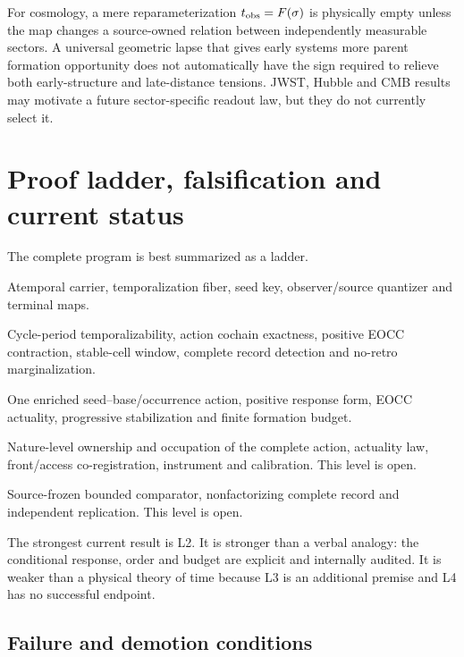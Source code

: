 \documentclass[11pt]{article}
\begin{document}
For cosmology, a mere reparameterization
\(t_{\rm obs}=F(\sigma)\) is physically empty unless the map changes a
source-owned relation between independently measurable sectors.  A universal
geometric lapse that gives early systems more parent formation opportunity
does not automatically have the sign required to relieve both early-structure
and late-distance tensions.  JWST, Hubble and CMB results may motivate a
future sector-specific readout law, but they do not currently select it.

\section{Proof ladder, falsification and current status}

The complete program is best summarized as a ladder.
\begin{description}[style=nextline,leftmargin=2.7cm]
\item[L0: definitions] Atemporal carrier, temporalization fiber, seed key,
observer/source quantizer and terminal maps.
\item[L1: exact finite mathematics] Cycle-period temporalizability, action
cochain exactness, positive EOCC contraction, stable-cell window, complete
record detection and no-retro marginalization.
\item[L2: conditional mechanism] One enriched seed--base/occurrence action,
positive response form, EOCC actuality, progressive stabilization and finite
formation budget.
\item[L3: physical source selection] Nature-level ownership and occupation of
the complete action, actuality law, front/access co-registration, instrument
and calibration.  This level is open.
\item[L4: empirical discrimination] Source-frozen bounded comparator,
nonfactorizing complete record and independent replication.  This level is
open.
\end{description}

The strongest current result is L2.  It is stronger than a verbal analogy:
the conditional response, order and budget are explicit and internally
audited.  It is weaker than a physical theory of time because L3 is an
additional premise and L4 has no successful endpoint.

\subsection{Failure and demotion conditions}
\end{document}

